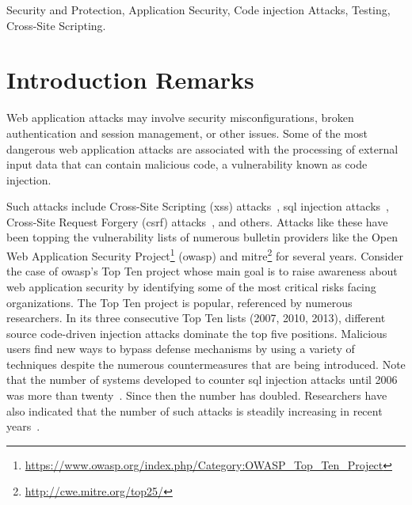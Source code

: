 \documentclass[conference]{IEEEtran}
\begin{document}
\begin{IEEEkeywords}
Security and Protection, Application Security, Code injection Attacks,
Testing, Cross-Site Scripting.
\end{IEEEkeywords}

\IEEEpeerreviewmaketitle

\section{Introduction Remarks}

Web application attacks may involve security misconfigurations, broken
authentication and session management, or other issues. Some of the
most dangerous web application attacks are associated with the
processing of external input data that can contain malicious code, a
vulnerability known as code injection.

Such attacks include Cross-Site Scripting ({\sc xss})
attacks~\cite{SG07}, {\sc sql} injection attacks~\cite{RL12b},
Cross-Site Request Forgery ({\sc csrf}) attacks~\cite{LZRL09}, and
others. Attacks like these have been topping the vulnerability lists
of numerous bulletin providers like the Open Web Application Security
Project\footnote{\url{https://www.owasp.org/index.php/Category:OWASP_Top_Ten_Project}}
({\sc owasp}) and {\sc
  mitre}\footnote{\url{http://cwe.mitre.org/top25/}} for several
years. Consider the case of {\sc owasp}'s Top Ten project whose main
goal is to raise awareness about web application security by
identifying some of the most critical risks facing organizations. The
Top Ten project is popular, referenced by numerous researchers. In its
three consecutive Top Ten lists (2007, 2010, 2013), different
source code-driven injection attacks dominate the top five
positions. Malicious users find new ways to bypass defense mechanisms
by using a variety of techniques despite the numerous countermeasures
that are being introduced. Note that the number of systems developed
to counter {\sc sql} injection attacks until 2006 was more than
twenty~\cite{HVO06}. Since then the number has doubled. Researchers
have also indicated that the number of such attacks is steadily
increasing in recent years~\cite{SSL12}.
\end{document}
